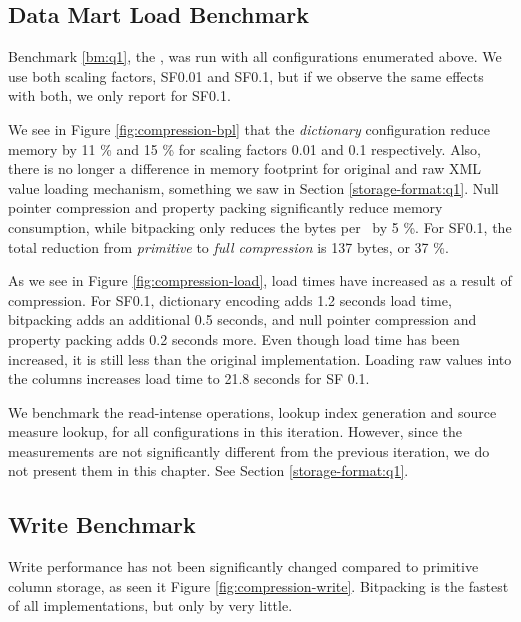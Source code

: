 \subsection{Data Mart Load Benchmark}
\label{compression:q1}
Benchmark \ref{bm:q1}, the \tpchdl, was run with all configurations enumerated above. We use both scaling factors, SF0.01 and SF0.1, but if we observe the same effects with both, we only report for SF0.1.

We see in Figure \ref{fig:compression-bpl} that the \textit{dictionary} configuration reduce memory by 11 \% and 15 \% for scaling factors 0.01 and 0.1 respectively. Also, there is no longer a difference in memory footprint for original and raw XML value loading mechanism, something we saw in Section \ref{storage-format:q1}. Null pointer compression and property packing significantly reduce memory consumption, while bitpacking only reduces the bytes per \lineitem~by 5 \%. For SF0.1, the total reduction from \textit{primitive} to \textit{full compression} is 137 bytes, or 37 \%.

As we see in Figure \ref{fig:compression-load}, load times have increased as a result of compression. For SF0.1, dictionary encoding adds 1.2 seconds load time, bitpacking adds an additional 0.5 seconds, and null pointer compression and property packing adds 0.2 seconds more. Even though load time has been increased, it is still less than the original implementation. Loading raw values into the columns increases load time to 21.8 seconds for SF 0.1. 

We benchmark the read-intense operations, lookup index generation and source measure lookup, for all configurations in this iteration. However, since the measurements are not significantly different from the previous iteration, we do not present them in this chapter. See Section \ref{storage-format:q1}.

\subsection{Write Benchmark}
\label{compression:write}
Write performance has not been significantly changed compared to primitive column storage, as seen it Figure \ref{fig:compression-write}. Bitpacking is the fastest of all implementations, but only by very little.

